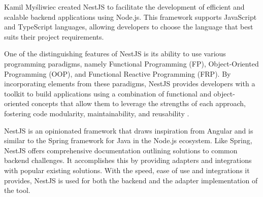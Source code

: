 Kamil Myśliwiec created NestJS \cite{nestjs} to facilitate the development of
efficient and scalable backend applications using Node.js. This framework
supports JavaScript and TypeScript languages, allowing developers to choose the
language that best suits their project requirements.

One of the distinguishing features of NestJS is its ability to use various
programming paradigms, namely Functional Programming (FP), Object-Oriented
Programming (OOP), and Functional Reactive Programming (FRP). By incorporating
elements from these paradigms, NestJS provides developers with a toolkit to
build applications using a combination of functional and object-oriented
concepts that allow them to leverage the strengths of each approach, fostering
code modularity, maintainability, and reusability \cite{nestjs}.

NestJS is an opinionated framework that draws inspiration from Angular and is
similar to the Spring framework for Java in the Node.js ecosystem. Like Spring,
NestJS offers comprehensive documentation outlining solutions to common backend
challenges. It accomplishes this by providing adapters and integrations with
popular existing solutions. With the speed, ease of use and integrations it
provides, NestJS is used for both the backend and the adapter implementation of
the tool.
